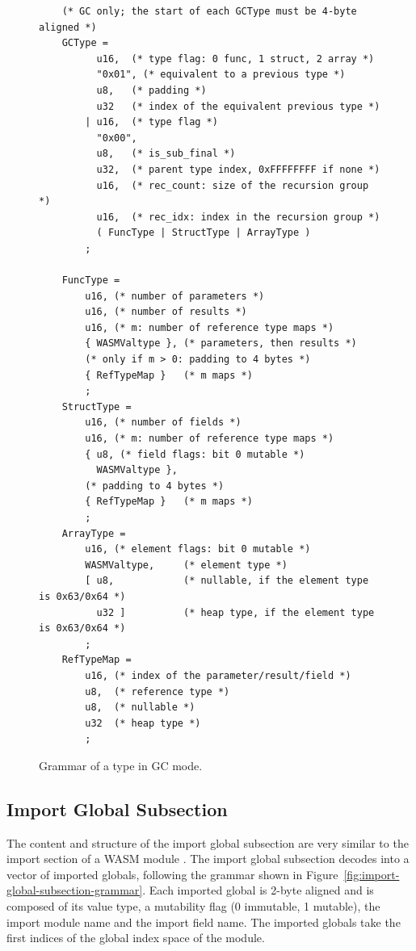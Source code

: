 \documentclass{article}
\begin{document}
\begin{figure}[H]
\begin{verbatim}
    (* GC only; the start of each GCType must be 4-byte aligned *)
    GCType =
          u16,  (* type flag: 0 func, 1 struct, 2 array *)
          "0x01", (* equivalent to a previous type *)
          u8,   (* padding *)
          u32   (* index of the equivalent previous type *)
        | u16,  (* type flag *)
          "0x00",
          u8,   (* is_sub_final *)
          u32,  (* parent type index, 0xFFFFFFFF if none *)
          u16,  (* rec_count: size of the recursion group *)
          u16,  (* rec_idx: index in the recursion group *)
          ( FuncType | StructType | ArrayType )
        ;

    FuncType =
        u16, (* number of parameters *)
        u16, (* number of results *)
        u16, (* m: number of reference type maps *)
        { WASMValtype }, (* parameters, then results *)
        (* only if m > 0: padding to 4 bytes *)
        { RefTypeMap }   (* m maps *)
        ;
    StructType =
        u16, (* number of fields *)
        u16, (* m: number of reference type maps *)
        { u8, (* field flags: bit 0 mutable *)
          WASMValtype },
        (* padding to 4 bytes *)
        { RefTypeMap }   (* m maps *)
        ;
    ArrayType =
        u16, (* element flags: bit 0 mutable *)
        WASMValtype,     (* element type *)
        [ u8,            (* nullable, if the element type is 0x63/0x64 *)
          u32 ]          (* heap type, if the element type is 0x63/0x64 *)
        ;
    RefTypeMap =
        u16, (* index of the parameter/result/field *)
        u8,  (* reference type *)
        u8,  (* nullable *)
        u32  (* heap type *)
        ;
\end{verbatim}
\caption{Grammar of a type in GC mode.}
\label{fig:gc-type-grammar}
\end{figure}

\subsection{Import Global Subsection}
The content and structure of the import global subsection are very similar to the import section of a WASM module \cite[Sec.~5.5.5]{webassembly2019core}.
The import global subsection decodes into a vector of imported globals, following the grammar shown in Figure~\ref{fig:import-global-subsection-grammar}.
Each imported global is 2-byte aligned and is composed of its value type, a mutability flag (0 immutable, 1 mutable), the import module name and the import field name.
The imported globals take the first indices of the global index space of the module.
\end{document}
